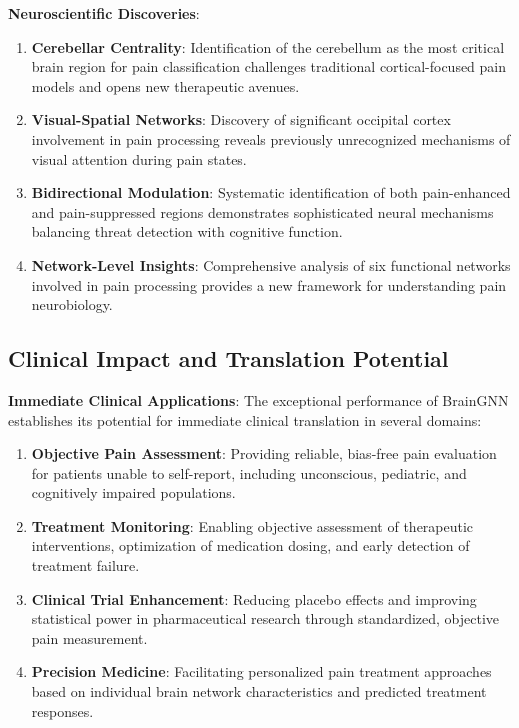 \textbf{Neuroscientific Discoveries}:
\begin{enumerate}
\item \textbf{Cerebellar Centrality}: Identification of the cerebellum as the most critical brain region for pain classification challenges traditional cortical-focused pain models and opens new therapeutic avenues.

\item \textbf{Visual-Spatial Networks}: Discovery of significant occipital cortex involvement in pain processing reveals previously unrecognized mechanisms of visual attention during pain states.

\item \textbf{Bidirectional Modulation}: Systematic identification of both pain-enhanced and pain-suppressed regions demonstrates sophisticated neural mechanisms balancing threat detection with cognitive function.

\item \textbf{Network-Level Insights}: Comprehensive analysis of six functional networks involved in pain processing provides a new framework for understanding pain neurobiology.
\end{enumerate}

\subsection{Clinical Impact and Translation Potential}

\textbf{Immediate Clinical Applications}:
The exceptional performance of BrainGNN establishes its potential for immediate clinical translation in several domains:

\begin{enumerate}
\item \textbf{Objective Pain Assessment}: Providing reliable, bias-free pain evaluation for patients unable to self-report, including unconscious, pediatric, and cognitively impaired populations.

\item \textbf{Treatment Monitoring}: Enabling objective assessment of therapeutic interventions, optimization of medication dosing, and early detection of treatment failure.

\item \textbf{Clinical Trial Enhancement}: Reducing placebo effects and improving statistical power in pharmaceutical research through standardized, objective pain measurement.

\item \textbf{Precision Medicine}: Facilitating personalized pain treatment approaches based on individual brain network characteristics and predicted treatment responses.
\end{enumerate}

